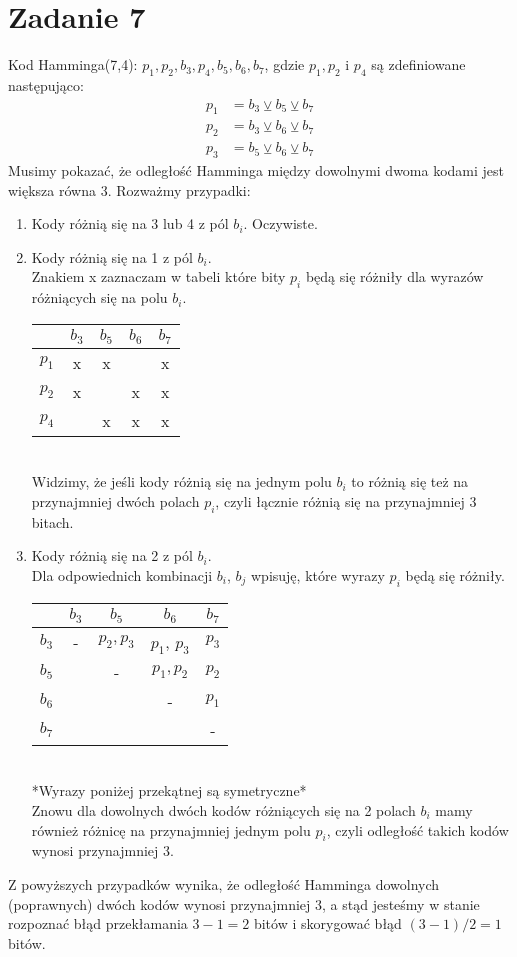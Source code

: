 \documentclass{article}
\begin{document}
\section{Zadanie 7}
Kod Hamminga(7,4): $p_1, p_2, b_3, p_4, b_5, b_6, b_7$, gdzie $p_1, p_2$ i $p_4$ są zdefiniowane następująco:
\begin{align}
    p_1 &= b_3 \veebar b_5 \veebar b_7 \\
    p_2 &= b_3 \veebar b_6 \veebar b_7 \\
    p_3 &= b_5 \veebar b_6 \veebar b_7 
\end{align}
Musimy pokazać, że odległość Hamminga między dowolnymi dwoma kodami jest większa równa 3. Rozważmy przypadki:
\begin{enumerate}
    \item Kody różnią się na 3 lub 4 z pól $b_i$. Oczywiste.
    \item Kody różnią się na 1 z pól $b_i$.\\
        Znakiem x zaznaczam w tabeli które bity $p_i$ będą się różniły dla wyrazów różniących się na polu $b_i$.\\
        \begin{tabular}{c|c|c|c|c}
             & $b_3$ & $b_5$& $b_6$& $b_7$\\\hline 
            $p_1$ & x & x & & x \\
            $p_2$ & x & & x & x \\
            $p_4$ & & x & x & x \\
        \end{tabular}\\
        Widzimy, że jeśli kody różnią się na jednym polu $b_i$ to różnią się też na przynajmniej dwóch polach $p_i$, czyli łącznie różnią się na przynajmniej 3 bitach.
    \item Kody różnią się na 2 z pól $b_i$.\\
        Dla odpowiednich kombinacji $b_i$, $b_j$ wpisuję, które wyrazy $p_i$ będą się różniły.\\
        \begin{tabular}{c|c|c|c|c}
             & $b_3$ & $b_5$ & $b_6$ & $b_7$\\\hline 
            $b_3$ & - & $p_2, p_3$ & $p_1$, $p_3$ & $p_3$\\
            $b_5$ & & - & $p_1, p_2$ & $p_2$\\
            $b_6$ & & & - & $p_1$\\
            $b_7$ & & & & - \\
        \end{tabular}\\
        *Wyrazy poniżej przekątnej są symetryczne*\\
        Znowu dla dowolnych dwóch kodów różniących się na 2 polach $b_i$ mamy również różnicę na przynajmniej jednym polu $p_i$, czyli odległość takich kodów wynosi przynajmniej 3.
\end{enumerate}
Z powyższych przypadków wynika, że odległość Hamminga dowolnych (poprawnych) dwóch kodów wynosi przynajmniej 3, a stąd jesteśmy w stanie rozpoznać błąd przekłamania $3-1=2$ bitów i skorygować błąd $(3-1)/2=1$ bitów.
\end{document}
